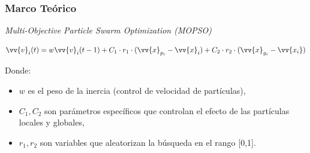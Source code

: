 \documentclass[usenames,dvipsnames]{beamer}
\begin{document}
\begin{frame}
\frametitle{Marco Teórico} 
\begin{exampleblock}{\textit{Multi-Objective Particle Swarm Optimization (MOPSO)}}

\begin{equation}\label{eq:velocidad1}
\vv{v}_i(t) = w \vv{v}_i(t-1) + C_1 \cdot r_1 \cdot (\vv{x}_{p_i} - \vv{x}_i) + C_2 \cdot r_2 \cdot (\vv{x}_{g_i} - \vv{x_i})
\end{equation}


Donde:

\begin{itemize}
\item $w$ es el peso de la inercia (control de velocidad de partículas),
\item $C_1,C_2$ son parámetros específicos que controlan el efecto de las partículas locales y globales,
\item $r_1,r_2$ son variables que aleatorizan la búsqueda en el rango [0,1].
\end{itemize}


\end{exampleblock}


\end{frame}
\end{document}
